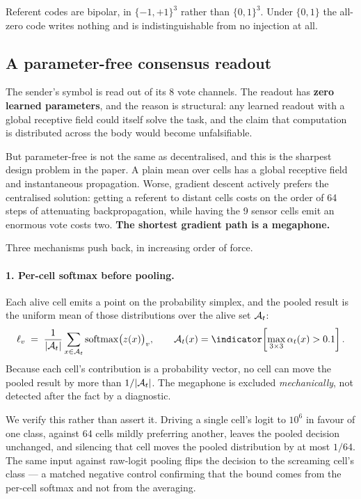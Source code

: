 Referent codes are bipolar, in $\{-1,+1\}^3$ rather than $\{0,1\}^3$. Under
$\{0,1\}$ the all-zero code writes nothing and is indistinguishable from no
injection at all.

\subsection{A parameter-free consensus readout}
\label{sec:readout}

The sender's symbol is read out of its 8 vote channels. The readout has
\textbf{zero learned parameters}, and the reason is structural: any learned
readout with a global receptive field could itself solve the task, and the claim
that computation is distributed across the body would become unfalsifiable.

But parameter-free is not the same as decentralised, and this is the sharpest
design problem in the paper. A plain mean over cells has a global receptive field
and instantaneous propagation. Worse, gradient descent actively prefers the
centralised solution: getting a referent to distant cells costs on the order of
64 steps of attenuating backpropagation, while having the 9 sensor cells emit an
enormous vote costs two. \textbf{The shortest gradient path is a megaphone.}

Three mechanisms push back, in increasing order of force.

\paragraph{1. Per-cell softmax before pooling.} Each alive cell emits a point on
the probability simplex, and the pooled result is the uniform mean of those
distributions over the alive set $\mathcal{A}_t$:
%
\begin{equation}
  \pooled_v \;=\; \frac{1}{|\alive_t|} \sum_{x \in \alive_t}
      \mathrm{softmax}\big(\vote(x)\big)_v ,
  \qquad
  \alive_t(x) = \indicator\!\left[\max_{3\times3} \alpha_t(x) > 0.1\right].
  \label{eq:pool}
\end{equation}
%
Because each cell's contribution is a probability vector, no cell can move the
pooled result by more than $1/|\mathcal{A}_t|$. The megaphone is excluded
\emph{mechanically}, not detected after the fact by a diagnostic.

We verify this rather than assert it. Driving a single cell's logit to $10^6$ in
favour of one class, against 64 cells mildly preferring another, leaves the
pooled decision unchanged, and silencing that cell moves the pooled distribution
by at most $1/64$. The same input against raw-logit pooling flips the decision to
the screaming cell's class --- a matched negative control confirming that the
bound comes from the per-cell softmax and not from the averaging.

